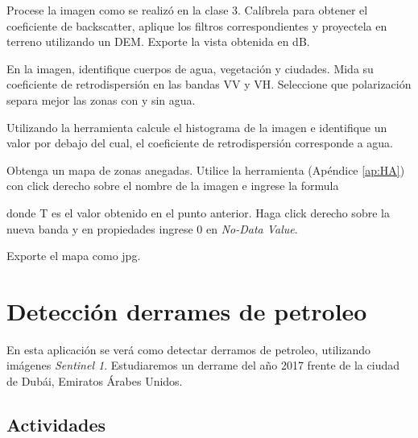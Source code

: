 \begin{que}
    Procese la imagen como se realizó en la clase 3. Calíbrela para obtener el coeficiente de backscatter, aplique los filtros correspondientes y proyectela en terreno utilizando un DEM. Exporte la vista obtenida en dB.
\end{que}

\begin{que}
    En la imagen, identifique cuerpos de agua, vegetación y ciudades. Mida su coeficiente de retrodispersión en las bandas VV y VH. Seleccione que polarización separa mejor las zonas con y sin agua.
\end{que}

\begin{que}
    Utilizando la herramienta  calcule el histograma de la imagen e identifique un valor por debajo del cual, el coeficiente de retrodispersión corresponde a agua.
\end{que}

\begin{que}
    Obtenga un mapa de zonas anegadas. Utilice la herramienta  (Apéndice \ref{ap:HA}) con click derecho sobre el nombre de la imagen e ingrese la formula
    \begin{center}
    \end{center}
    donde T es el valor obtenido en el punto anterior. Haga click derecho sobre la nueva banda y en propiedades ingrese 0 en \emph{No-Data Value}.
\end{que}

\begin{que}
    Exporte el mapa como jpg.
\end{que}


\section{Detección derrames de petroleo}

En esta aplicación se verá como detectar derramos de petroleo, utilizando imágenes \emph{Sentinel 1}. Estudiaremos un derrame del año 2017 frente de la ciudad de Dubái, Emiratos Árabes Unidos.

%


\subsection{Actividades}

